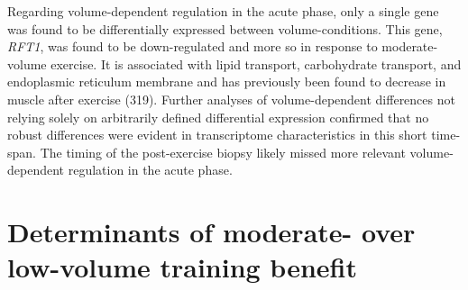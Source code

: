 \documentclass[twoside,10pt]{gihclass} %
\begin{document}
Regarding volume-dependent regulation in the acute phase, only a single gene was found to be differentially expressed between volume-conditions. This gene, \emph{RFT1}, was found to be down-regulated and more so in response to moderate-volume exercise. It is associated with lipid transport, carbohydrate transport, and endoplasmic reticulum membrane and has previously been found to decrease in muscle after exercise (319).
Further analyses of volume-dependent differences not relying solely on arbitrarily defined differential expression confirmed that no robust differences were evident in transcriptome characteristics in this short time-span.
The timing of the post-exercise biopsy likely missed more relevant volume-dependent regulation in the acute phase.

\hypertarget{determinants}{%
\section{Determinants of moderate- over low-volume training benefit}\label{determinants}}
\end{document}
